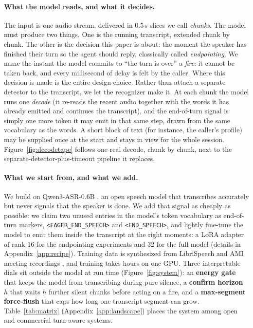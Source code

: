 \documentclass[11pt]{article}
\newcommand{\fire}{\texttt{<END\_SPEECH>}}
\newcommand{\eager}{\texttt{<EAGER\_END\_SPEECH>}}
\begin{document}
\paragraph{What the model reads, and what it decides.} The input is one audio stream, delivered in 0.5\,s slices we call \emph{chunks}. The model must produce two things. One is the running transcript, extended chunk by chunk. The other is the decision this paper is about: the moment the speaker has finished their turn so the agent should reply, classically called \emph{endpointing}. We name the instant the model commits to ``the turn is over'' a \emph{fire}: it cannot be taken back, and every millisecond of delay is felt by the caller. Where this decision is made is the entire design choice. Rather than attach a separate detector to the transcript, we let the recognizer make it. At each chunk the model runs one \emph{decode} (it re-reads the recent audio together with the words it has already emitted and continues the transcript), and the end-of-turn signal is simply one more token it may emit in that same step, drawn from the same vocabulary as the words. A short block of text (for instance, the caller's profile) may be supplied once at the start and stays in view for the whole session. Figure~\ref{fig:decodetape} follows one real decode, chunk by chunk, next to the separate-detector-plus-timeout pipeline it replaces.

\paragraph{What we start from, and what we add.} We build on Qwen3-ASR-0.6B \citep{qwen3asr2026}, an open speech model that transcribes accurately but never signals that the speaker is done. We add that signal as cheaply as possible: we claim two unused entries in the model's token vocabulary as end-of-turn markers, \eager{} and \fire, and lightly fine-tune the model to emit them inside the transcript at the right moments: a LoRA adapter \citep{hu2022lora} of rank 16 for the endpointing experiments and 32 for the full model (details in Appendix~\ref{app:recipe}). Training data is synthesized from LibriSpeech \citep{panayotov2015librispeech} and AMI meeting recordings \citep{carletta2005ami}, and training takes hours on one GPU. Three interpretable dials sit outside the model at run time (Figure~\ref{fig:system}): an \textbf{energy gate} that keeps the model from transcribing during pure silence, a \textbf{confirm horizon} $h$ that waits $h$ further silent chunks before acting on a fire, and a \textbf{max-segment force-flush} that caps how long one transcript segment can grow. Table~\ref{tab:matrix} (Appendix~\ref{app:landscape}) places the system among open and commercial turn-aware systems.
\end{document}
